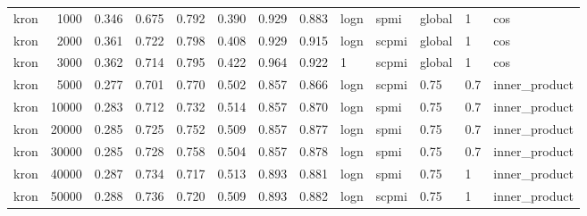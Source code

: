 \begin{tabular}{lrrrrrrrlllll}
    kron &            1000 &      0.346 &  0.675 &  0.792 &  0.390 &      0.929 &      0.883 &  logn &   spmi &  global &    1 &            cos \\
    kron &            2000 &      0.361 &  0.722 &  0.798 &  0.408 &      0.929 &      0.915 &  logn &  scpmi &  global &    1 &            cos \\
    kron &            3000 &      0.362 &  0.714 &  0.795 &  0.422 &      0.964 &      0.922 &     1 &  scpmi &  global &    1 &            cos \\
    kron &            5000 &      0.277 &  0.701 &  0.770 &  0.502 &      0.857 &      0.866 &  logn &  scpmi &    0.75 &  0.7 &  inner\_product \\
    kron &           10000 &      0.283 &  0.712 &  0.732 &  0.514 &      0.857 &      0.870 &  logn &   spmi &    0.75 &  0.7 &  inner\_product \\
    kron &           20000 &      0.285 &  0.725 &  0.752 &  0.509 &      0.857 &      0.877 &  logn &   spmi &    0.75 &  0.7 &  inner\_product \\
    kron &           30000 &      0.285 &  0.728 &  0.758 &  0.504 &      0.857 &      0.878 &  logn &   spmi &    0.75 &  0.7 &  inner\_product \\
    kron &           40000 &      0.287 &  0.734 &  0.717 &  0.513 &      0.893 &      0.881 &  logn &   spmi &    0.75 &    1 &  inner\_product \\
    kron &           50000 &      0.288 &  0.736 &  0.720 &  0.509 &      0.893 &      0.882 &  logn &  scpmi &    0.75 &    1 &  inner\_product \\
\bottomrule
\end{tabular}
